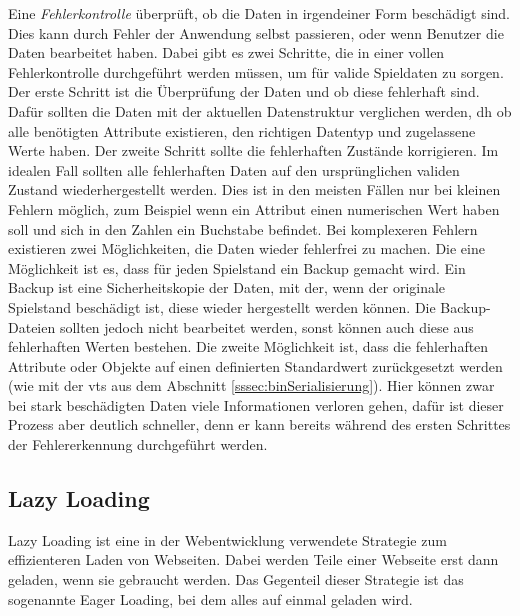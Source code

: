 Eine \textit{Fehlerkontrolle} überprüft, ob die Daten in irgendeiner Form beschädigt sind. Dies kann durch Fehler der Anwendung selbst passieren, oder wenn Benutzer die Daten bearbeitet haben. Dabei gibt es zwei Schritte, die in einer vollen Fehlerkontrolle durchgeführt werden müssen, um für valide Spieldaten zu sorgen. Der erste Schritt ist die Überprüfung der Daten und ob diese fehlerhaft sind. Dafür sollten die Daten mit der aktuellen Datenstruktur verglichen werden, \ac{dh} ob alle benötigten Attribute existieren, den richtigen Datentyp und zugelassene Werte haben. Der zweite Schritt sollte die fehlerhaften Zustände korrigieren. Im idealen Fall sollten alle fehlerhaften Daten auf den ursprünglichen validen Zustand wiederhergestellt werden. Dies ist in den meisten Fällen nur bei kleinen Fehlern möglich, zum Beispiel wenn ein Attribut einen numerischen Wert haben soll und sich in den Zahlen ein Buchstabe befindet. Bei komplexeren Fehlern existieren zwei Möglichkeiten, die Daten wieder fehlerfrei zu machen. Die eine Möglichkeit ist es, dass für jeden Spielstand ein Backup gemacht wird. Ein Backup ist eine Sicherheitskopie der Daten, mit der, wenn der originale Spielstand beschädigt ist, diese wieder hergestellt werden können.\cite{ibmDevelopingBackup} Die Backup-Dateien sollten jedoch nicht bearbeitet werden, sonst können auch diese aus fehlerhaften Werten bestehen. Die zweite Möglichkeit ist, dass die fehlerhaften Attribute oder Objekte auf einen definierten Standardwert zurückgesetzt werden (wie mit der \ac{vts} aus dem Abschnitt \ref{sssec:binSerialisierung}). Hier können zwar bei stark beschädigten Daten viele Informationen verloren gehen, dafür ist dieser Prozess aber deutlich schneller, denn er kann bereits während des ersten Schrittes der Fehlererkennung durchgeführt werden.



\subsection{Lazy Loading} \label{ssect:lazyloading}
Lazy Loading ist eine in der Webentwicklung verwendete Strategie zum effizienteren Laden von Webseiten. Dabei werden Teile einer Webseite erst dann geladen, wenn sie gebraucht werden. Das Gegenteil dieser Strategie ist das sogenannte Eager Loading, bei dem alles auf einmal geladen wird.\cite{cloudflareLazyLoad}

